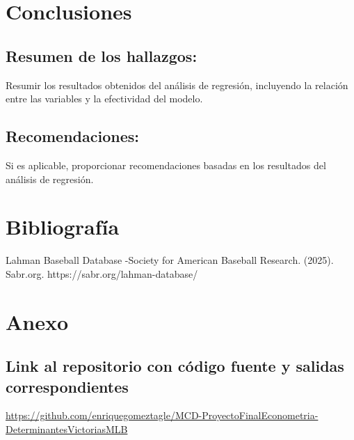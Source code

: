 \documentclass[10pt]{article}
\begin{document}
\section{Conclusiones}
\subsection{Resumen de los hallazgos:}
Resumir los resultados obtenidos del análisis de regresión, incluyendo la relación entre las variables y la efectividad del modelo.

\subsection{Recomendaciones:}
Si es aplicable, proporcionar recomendaciones basadas en los resultados del análisis de regresión.
\section{Bibliografía}
Lahman Baseball Database -Society for American Baseball Research. (2025). Sabr.org. https://sabr.org/lahman-database/
\section{Anexo}
\subsection{Link al repositorio con código fuente y salidas correspondientes}
\href{https://github.com/enriquegomeztagle/MCD-ProyectoFinalEconometria-DeterminantesVictoriasMLB}{https://github.com/enriquegomeztagle/MCD-ProyectoFinalEconometria-DeterminantesVictoriasMLB}
\end{document}
